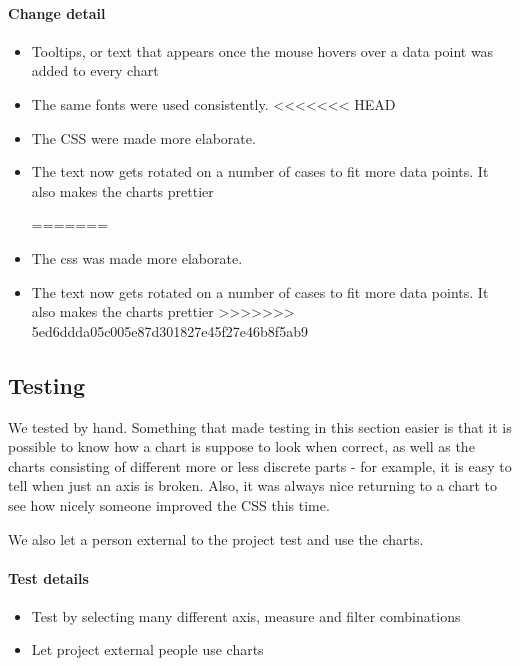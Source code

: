\paragraph{Change detail}
\begin{itemize}
  \item Tooltips, or text that appears once the mouse hovers over a data point was added to every chart
  \item The same fonts were used consistently.
<<<<<<< HEAD
  \item The CSS were made more elaborate.
  \item The text now gets rotated on a number of cases to fit more data points. It also makes the charts prettier

=======
  \item The css was made more elaborate.
  \item The text now gets rotated on a number of cases to fit more data points. It also makes the charts prettier
>>>>>>> 5ed6ddda05c005e87d301827e45f27e46b8f5ab9
\end{itemize}

  
\subsection{Testing}
 We tested by hand. Something that made testing in this section easier is that it is possible to know
 how a chart is suppose to look when correct, as well as the charts consisting of different more or less discrete
 parts - for example, it is easy to tell when just an axis is broken.
 Also, it was always nice returning to a chart to see how nicely someone improved the CSS this time. 
 
 We also let a person external to the project test and use the charts.

\paragraph{Test details}
\begin{itemize}
  \item Test by selecting many different axis, measure and filter combinations
  \item Let project external people use charts
\end{itemize}

